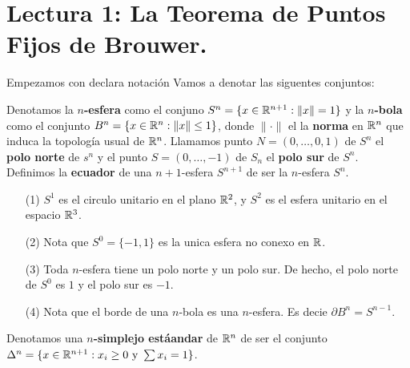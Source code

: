 \section*{Lectura 1: La Teorema de Puntos Fijos de Brouwer.}

Empezamos con declara notaci\'on Vamos a denotar las siguentes conjuntos:

\begin{definition}
    Denotamos la \textbf{$n$-esfera} como el conjuno $S^n=\{x \in
    \mathbb{R}^{n+1} : \|x\|=1\}$ y la \textbf{$n$-bola} como el conjunto $B^n=\{x
    \in \mathbb{R}^{n} : \|x\| \leq 1\}$, donde $\|\cdot\|$ el la \textbf{norma} en
    $\mathbb{R}^n$ que induca la topolog\'ia usual de $\mathbb{R}^n$. Llamamos punto
    $N=(0,\dots,0,1)$ de $S^n$ el \textbf{polo norte} de $s^n$ y el punto $S=(0,
    \dots, -1)$ de $S_n$ el  \textbf{polo sur} de $S^n$. Definimos la
    \textbf{ecuador} de una $n+1$-esfera $S^{n+1}$ de ser la $n$-esfera $S^n$.
\end{definition}

\begin{example}\label{exmp_1}
    \begin{enumerate}
        \item[(1)] $S^1$ es el circulo unitario en el plano $\mathbb{R}^2$, y  $S^2$ es
            el esfera unitario en el espacio $\mathbb{R}^3$.

        \item[(2)] Nota que $S^0=\{-1,1\}$ es la unica esfera no conexo en $\mathbb{R}$.

        \item[(3)] Toda $n$-esfera tiene un polo norte y un polo sur. De hecho,
            el polo norte de $S^0$ es $1$ y el polo sur es $-1$.

        \item[(4)] Nota que el borde de una $n$-bola es una  $n$-esfera. Es
            decie  $\partial{B^n}=S^{n-1}$.
    \end{enumerate}
\end{example}

\begin{definition}
    Denotamos una \textbf{$n$-simplejo est\'aandar} de $\mathbb{R}^n$ de ser el conjunto
    $\Delta^n=\{x \in \mathbb{R}^{n+1} : x_i \geq 0 \text{ y } \sum{x_i}=1\}$.
\end{definition}

